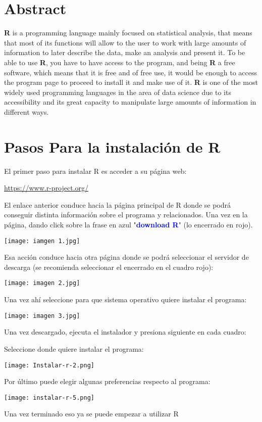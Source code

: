 \documentclass{article}
\begin{document}
\section{Abstract}
\textbf{R} is a programming language mainly focused on statistical analysis,
that means that most of its functions will allow to the user to work
with large amounts of information to later describe the data, make an
analysis and present it. To be able to use \textbf{R}, you have to have access to the
program, and being \textbf{R} a free software, which means that it is free and of free
use, it would be enough to access the program page to proceed to install it and
make use of it. \textbf{R} is one of the most widely used programming languages in
the area of data science due to its accessibility and its great capacity to
manipulate large amounts of information in different ways.
\section{Pasos Para la instalación de R}
El primer paso para instalar R es acceder a su página web:\\
\begin{center}
\url{https://www.r-project.org/}    
\end{center}
El enlace anterior conduce hacia la página principal de R donde se podrá conseguir distinta información sobre el programa y relacionados. Una vez en la página, dando click sobre la frase en azul "\textcolor{blue}{\textbf{download R}}\textbf{}" (lo encerrado en rojo).\\
\begin{center}
\texttt{[image: iamgen 1.jpg]}    
\end{center}
Esa acción conduce hacia otra página donde se podrá seleccionar el servidor de descarga (se recomienda seleccionar el encerrado en el cuadro rojo):
\begin{center}
    \texttt{[image: imagen 2.jpg]}
\end{center}
Una vez ahí seleccione para que sistema operativo quiere instalar el programa:\\
\begin{center}
    \texttt{[image: imagen 3.jpg]}
\end{center}
Una vez descargado, ejecuta el instalador y presiona siguiente en cada cuadro:\\
\begin{center}
\end{center}
Seleccione donde quiere instalar el programa:\\
\begin{center}
    \texttt{[image: Instalar-r-2.png]}
\end{center}
Por último puede elegir algunas preferencias respecto al programa:\\
\begin{center}
    \texttt{[image: instalar-r-5.png]}
\end{center}
Una vez terminado eso ya se puede empezar a utilizar R
\end{document}
